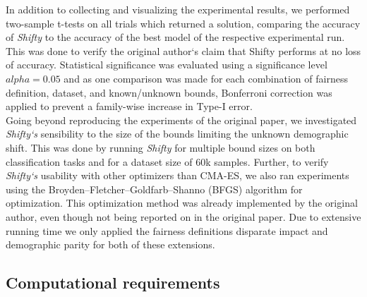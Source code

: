 
In addition to collecting and visualizing the experimental results, we performed two-sample t-tests on all trials which returned a solution, comparing the accuracy of \textit{Shifty} to the accuracy of the best model of the respective experimental run. This was done to verify the original author`s claim that Shifty performs at no loss of accuracy. Statistical significance was evaluated using a significance level $alpha = 0.05$ and as one comparison was made for each combination of fairness definition, dataset, and known/unknown bounds, Bonferroni correction was applied to prevent a family-wise increase in Type-I error. \\

Going beyond reproducing the experiments of the original paper, we investigated \textit{Shifty`s} sensibility to the size of the bounds limiting the unknown demographic shift. This was done by running \textit{Shifty} for multiple bound sizes on both classification tasks and for a dataset size of 60k samples. Further, to verify \textit{Shifty`s} usability with other optimizers than CMA-ES, we also ran experiments using the Broyden–Fletcher–Goldfarb–Shanno (BFGS) algorithm for optimization. This optimization method was already implemented by the original author, even though not being reported on in the original paper. Due to extensive running time we only applied the fairness definitions disparate impact and demographic parity for both of these extensions.

\subsection{Computational requirements}

